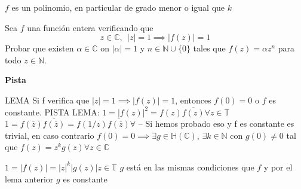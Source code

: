 $f$ es un polinomio, en particular de grado menor o igual que $k$


\begin{ejer}
	Sea $f$ una función entera verificando que
	$$ z\in\mathbb{C}, \ \ |z|=1 \implies |f(z)|=1 $$
	Probar que existen $\alpha\in\mathbb{C}$ on $|\alpha|=1$ y $n\in\mathbb{N}\cup \{0\}$ tales que $f(z) = \alpha z^n$ para todo $z\in\mathbb{N}$.
\end{ejer}

\textbf{Pista}

LEMA
Si f verifica que $|z|=1 \implies |f(z)|=1$, entonces $f(0)=0$ o $f$ es constante.
PISTA LEMA:
$1=|f(z)|^2 = f(z)\overline{f(z)} \forall z\in\mathbb{T}$ 
$1= f(\overline{z})\overline{f(\overline{z})} = f(1/z)\overline{f(\overline{z})}\forall $ 
--
Si hemos probado eso y f es constante es trivial, en caso contrario
$f(0)=0 \implies \exists g\in\mathbb{H}(\mathbb{C})$, $\exists k\in\mathbb{N}$ con $g(0) \not =0$ tal que
$f(z) = z^kg(z) \forall z\in\mathbb{C}$

$1=|f(z)| = |z|^k|g(z)| z\in\mathbb{T}$
$g$ está en las mismas condiciones que $f$ y por el lema anterior $g$ es constante